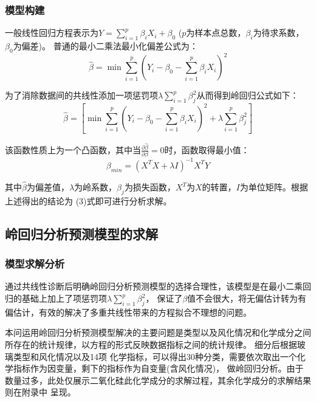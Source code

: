 \documentclass[UTF8]{ctexart}
\begin{document}
                \subsubsection{模型构建}
                一般线性回归方程表示为$Y=\sum_{i=1}^p \beta_i X_i + \beta_0$ ($p$为样本点总数，$\beta_i$为待求系数，$\beta_0$为偏差)。
                普通的最小二乘法最小化偏差公式为：
                \begin{equation}
                    \hat{\beta } = \min \sum_{i=1}^p(Y_i-\beta_0 - \sum_{i=1}^p \beta_i X_i)^2
                \end{equation}

                为了消除数据间的共线性添加一项惩罚项$\lambda \sum_{i=1}^p \beta_{j}^2$从而得到岭回归公式如下：
                \begin{equation}
                    \hat{\beta } = [\min \sum_{i=1}^p(Y_i-\beta_0 - \sum_{i=1}^p \beta_i X_i)^2 + \lambda \sum_{i=1}^p \beta_{j}^2]
                \end{equation}

                该函数性质上为一个凸函数，其中当$\frac{\partial \widehat{\beta} }{\partial \beta}=0$时，函数取得最小值：
                \begin{equation}
                    \beta_{min} = (X^T X+\lambda I)^{-1} X^T Y
                \end{equation}

                其中$\hat{\beta }$为偏差值，$\lambda$为岭系数，$\beta_{j}$为损失函数，$X^T$为$X$的转置，$I$为单位矩阵。根据上述得出的结论为
                (3)式即可进行分析求解。




                \subsection{岭回归分析预测模型的求解}
                \subsubsection{模型求解分析}
                通过共线性诊断后明确岭回归分析预测模型的选择合理性，该模型是在最小二乘回归的基础上加上了项惩罚项$\lambda \sum_{i=1}^p \beta_{j}^2$，
                保证了$\beta$值不会很大，将无偏估计转为有偏估计，有效的解决了多重共线性带来的方程拟合不理想的问题。

                本问运用岭回归分析预测模型解决的主要问题是类型以及风化情况和化学成分之间所存在的统计规律，以方程的形式反映数据指标之间的统计规律。
                细分后根据玻璃类型和风化情况以及14项
                化学指标，可以得出30种分类，需要依次取出一个化学指标作为因变量，剩下的指标作为自变量(含风化情况)，
                做岭回归分析。由于数量过多，此处仅展示二氧化硅此化学成分的求解过程，其余化学成分的求解结果则在附录中
                呈现。
\end{document}
